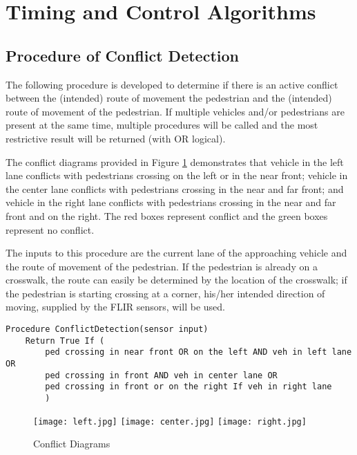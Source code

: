 \documentclass{article}
\begin{document}
\section{Timing and Control Algorithms}
\subsection{Procedure of Conflict Detection}
The following procedure is developed to determine if there is an active conflict between the (intended) route of movement the pedestrian and the (intended) route of movement of the pedestrian. If multiple vehicles and/or pedestrians are present at the same time, multiple procedures will be called and the most restrictive result will be returned (with OR logical).

The conflict diagrams provided in Figure \ref{fig:condlict} demonstrates that vehicle in the left lane conflicts with pedestrians crossing on the left or in the near front; vehicle in the center lane conflicts with pedestrians crossing in the near and far front; and vehicle in the right lane conflicts with pedestrians crossing in the near and far front and on the right. The red boxes represent conflict and the green boxes represent no conflict.

The inputs to this procedure are the current lane of the approaching vehicle and the route of movement of the pedestrian. If the pedestrian is already on a crosswalk, the route can easily be determined by the location of the crosswalk; if the pedestrian is starting crossing at a corner, his/her intended direction of moving, supplied by the FLIR sensors, will be used.

\begin{verbatim}
Procedure ConflictDetection(sensor input)
    Return True If (
        ped crossing in near front OR on the left AND veh in left lane OR 
        ped crossing in front AND veh in center lane OR
        ped crossing in front or on the right If veh in right lane
        )
\end{verbatim}
\begin{figure}
    \centering
    \texttt{[image: left.jpg]}
    \texttt{[image: center.jpg]}
    \texttt{[image: right.jpg]}
    \caption{Conflict Diagrams}
    \label{fig:condlict}
\end{figure}

\end{document}
